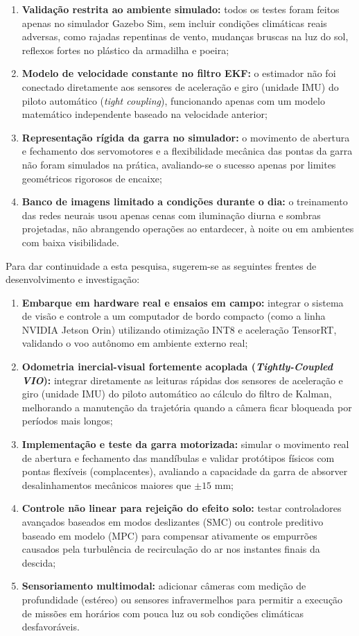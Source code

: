 \begin{enumerate}
	\item \textbf{Validação restrita ao ambiente simulado:} todos os testes foram feitos apenas no simulador Gazebo Sim, sem incluir condições climáticas reais adversas, como rajadas repentinas de vento, mudanças bruscas na luz do sol, reflexos fortes no plástico da armadilha e poeira;
	\item \textbf{Modelo de velocidade constante no filtro EKF:} o estimador não foi conectado diretamente aos sensores de aceleração e giro (unidade IMU) do piloto automático (\textit{tight coupling}), funcionando apenas com um modelo matemático independente baseado na velocidade anterior;
	\item \textbf{Representação rígida da garra no simulador:} o movimento de abertura e fechamento dos servomotores e a flexibilidade mecânica das pontas da garra não foram simulados na prática, avaliando-se o sucesso apenas por limites geométricos rigorosos de encaixe;
	\item \textbf{Banco de imagens limitado a condições durante o dia:} o treinamento das redes neurais usou apenas cenas com iluminação diurna e sombras projetadas, não abrangendo operações ao entardecer, à noite ou em ambientes com baixa visibilidade.
\end{enumerate}


Para dar continuidade a esta pesquisa, sugerem-se as seguintes frentes de desenvolvimento e investigação:

\begin{enumerate}
	\item \textbf{Embarque em hardware real e ensaios em campo:} integrar o sistema de visão e controle a um computador de bordo compacto (como a linha NVIDIA Jetson Orin) utilizando otimização INT8 e aceleração TensorRT, validando o voo autônomo em ambiente externo real;
	\item \textbf{Odometria inercial-visual fortemente acoplada (\textit{Tightly-Coupled VIO}):} integrar diretamente as leituras rápidas dos sensores de aceleração e giro (unidade IMU) do piloto automático ao cálculo do filtro de Kalman, melhorando a manutenção da trajetória quando a câmera ficar bloqueada por períodos mais longos;
	\item \textbf{Implementação e teste da garra motorizada:} simular o movimento real de abertura e fechamento das mandíbulas e validar protótipos físicos com pontas flexíveis (complacentes), avaliando a capacidade da garra de absorver desalinhamentos mecânicos maiores que $\pm 15\text{ mm}$;
	\item \textbf{Controle não linear para rejeição do efeito solo:} testar controladores avançados baseados em modos deslizantes (SMC) ou controle preditivo baseado em modelo (MPC) para compensar ativamente os empurrões causados pela turbulência de recirculação do ar nos instantes finais da descida;
	\item \textbf{Sensoriamento multimodal:} adicionar câmeras com medição de profundidade (estéreo) ou sensores infravermelhos para permitir a execução de missões em horários com pouca luz ou sob condições climáticas desfavoráveis.
\end{enumerate}
